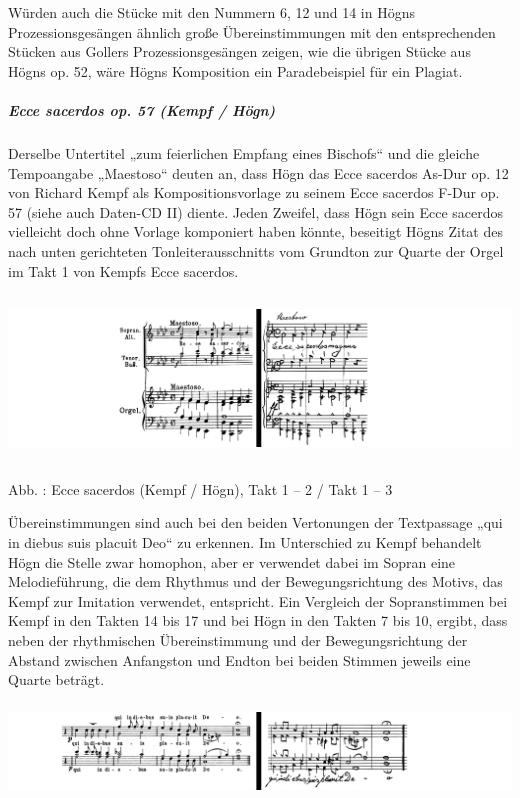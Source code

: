 Würden auch die Stücke mit den Nummern 6, 12 und 14 in Högns
Prozessionsgesängen ähnlich große Übereinstimmungen mit den
entsprechenden Stücken aus Gollers Prozessionsgesängen zeigen, wie die
übrigen Stücke aus Högns op. 52, wäre Högns Komposition ein
Paradebeispiel für ein Plagiat.

\subparagraph[Ecce sacerdos op. 57 (Kempf / Högn)]{Ecce sacerdos op. 57
(Kempf / Högn)}
Derselbe Untertitel „zum feierlichen Empfang eines Bischofs“ und die
gleiche Tempoangabe „Maestoso“ deuten an, dass Högn das Ecce sacerdos
As-Dur op. 12 von Richard Kempf als Kompositionsvorlage zu seinem Ecce
sacerdos F-Dur op. 57 (siehe auch Daten-CD II) diente. Jeden Zweifel,
dass Högn sein Ecce sacerdos vielleicht doch ohne Vorlage komponiert
haben könnte, beseitigt Högns Zitat des nach unten gerichteten
Tonleiterausschnitts vom Grundton zur Quarte der Orgel im Takt 1 von
Kempfs Ecce sacerdos.


\includegraphics[width=15.977cm,height=4.394cm]{pictures/zulassungsarbeit-img085.png}


Abb. : Ecce sacerdos (Kempf / Högn), Takt 1 –
2  / Takt 1 – 3

Übereinstimmungen sind auch bei den beiden Vertonungen der Textpassage
„qui in diebus suis placuit Deo“ zu erkennen. Im Unterschied zu Kempf
behandelt Högn die Stelle zwar homophon, aber er verwendet dabei im
Sopran eine Melodieführung, die dem Rhythmus und der Bewegungsrichtung
des Motivs, das Kempf zur Imitation verwendet, entspricht. Ein
Vergleich der Sopranstimmen bei Kempf in den Takten 14 bis 17 und bei
Högn in den Takten 7 bis 10, ergibt, dass neben der rhythmischen
Übereinstimmung und der Bewegungsrichtung der Abstand zwischen
Anfangston und Endton bei beiden Stimmen jeweils eine Quarte beträgt.


\includegraphics[width=15.977cm,height=2.499cm]{pictures/zulassungsarbeit-img086.png}



